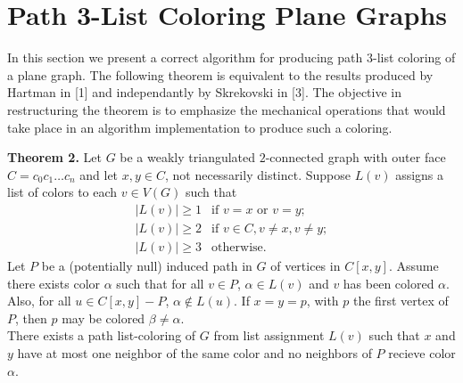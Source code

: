 \documentclass[11pt,letter]{article}
\begin{document}
\begin{comment}
  \node (1c2) at (1cm,1.25cm) {$c_2$};
  \node (1c3) at (2.25cm,1cm) {$c_3$};
  
  \node (c3) at (3.25cm,1cm) {$c_3$};
  \node (c4) at (4cm,0cm) {$c_4$};
  \node (c5) at (3.25cm,-1cm) {$c_5$};
  \node (c6) at (2cm,-1.25cm) {$c_6$};
  
  \node (2c6) at (1cm,-1.25cm) {$c_6$};
  \node (2c7) at (-0.25cm,-1cm) {$c_7$};
  
  \draw (0c1) -- (0c2); \draw (1c2) -- (1c3); \draw (c3) -- (c4) -- (c5) -- (c6) -- (c3);
  \draw (2c6) -- (2c7); \draw (c3)-- (c5) [dashed];
\end{tikzpicture}
\hfill\\
\hfill\\
\footnotesize{Removing $c_0$ and disecting into blocks with Theorem 2.}
\end{center}
\end{adjustwidth}
\hfill

\noindent Note that when applying Theorem 2, $G-c_0$ is $2$-connected
(i.e. $G-c_0=G_0$) if and only if Theorem 1 applies.

\end{comment}

\section*{Path 3-List Coloring Plane Graphs}

In this section we present a correct algorithm for producing path $3$-list coloring of a plane graph. The following
theorem is equivalent to the results produced by Hartman in [1] and independantly by Skrekovski in [3]. The objective in restructuring
the theorem is to emphasize the mechanical operations that would take place in an algorithm implementation
to produce such a coloring.\\

\begin{adjustwidth}{2em}{2em}
\noindent\textbf{Theorem 2.} Let $G$ be a weakly triangulated $2$-connected graph with outer face $C=c_0c_1\ldots c_{n}$
and let $x,y\in C$, not necessarily distinct.
Suppose $L(v)$ assigns a list of colors to each $v\in V(G)$ such that
\[
    \begin{array}{ll}
	    |L(v)|\ge 1 & \text{if } v=x \text{ or } v=y;\\
	    |L(v)|\ge 2 & \text{if } v\in C, v\ne x, v\ne y;\\
	    |L(v)|\ge 3 & \text{otherwise.}
    \end{array}
\]
Let $P$ be a (potentially null) induced path in $G$ of vertices in $C[x,y]$. Assume
there exists color $\alpha$ such that for all $v\in P$, $\alpha\in L(v)$ and $v$ has been colored $\alpha$. Also,
for all $u\in C[x,y]-P$, $\alpha\not\in L(u)$. If $x=y=p$, with $p$ the first vertex of $P$,
then $p$ may be colored $\beta\ne\alpha$.\\

\noindent There exists a path list-coloring of $G$ from list assignment $L(v)$ such that $x$ and $y$ have at
most one neighbor of the same color and no neighbors of $P$ recieve color $\alpha$.\\
\end{adjustwidth}
\end{document}
